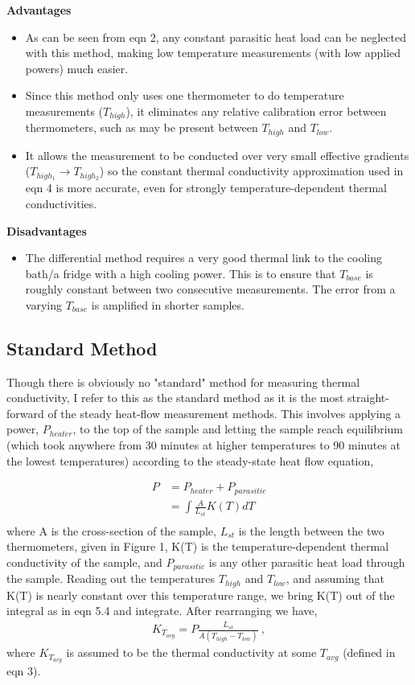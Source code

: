 \documentclass{report}
\begin{document}
\textbf{Advantages}
\begin{itemize}
\item As can be seen from eqn 2, any constant parasitic heat load can be neglected with this method, making low temperature measurements (with low applied powers) much easier.
\item Since this method only uses one thermometer to do temperature measurements ($T_{high}$), it eliminates any relative calibration error between thermometers, such as may be present between $T_{high}$ and $T_{low}$.
\item It allows the measurement to be conducted over very small effective gradients ($T_{high_1} \rightarrow T_{high_2}$) so the constant thermal conductivity approximation used in eqn 4 is more accurate, even for strongly temperature-dependent thermal conductivities.
\end{itemize}

\bigskip

\textbf{Disadvantages}
\begin{itemize}
\item The differential method requires a very good thermal link to the cooling bath/a fridge with a high cooling power. This is to ensure that $T_{base}$ is roughly constant between two consecutive measurements. The error from a varying $T_{base}$ is amplified in shorter samples.
\end{itemize}

\subsection{Standard Method}
Though there is obviously no "standard" method for measuring thermal conductivity, I refer to this as the standard method as it is the most straight-forward of the steady heat-flow measurement methods. This involves applying a power, $P_{heater}$, to the top of the sample and letting the sample reach equilibrium (which took anywhere from 30 minutes at higher temperatures to 90 minutes at the lowest temperatures) according to the steady-state heat flow equation,

\begin{equation}
    \begin{aligned}
P & = P_{heater} + P_{parasitic}\\
  & = \int \frac{A}{L_{st}} K(T)dT\\
    \end{aligned}
\end{equation}
where A is the cross-section of the sample, $L_{st}$ is the length between the two thermometers, given in Figure 1, K(T) is the temperature-dependent thermal conductivity of the sample, and $P_{parasitic}$ is any other parasitic heat load through the sample. Reading out the temperatures $T_{high}$ and $T_{low}$, and assuming that K(T) is nearly constant over this temperature range, we bring K(T) out of the integral as in eqn 5.4 and integrate. After rearranging we have,
\begin{eqnarray}
K_{T_{avg}} = P\frac{L_{st}}{A(T_{high} - T_{low})} \ ,
\end{eqnarray}
where $K_{T_{avg}}$ is assumed to be the thermal conductivity at some $T_{avg}$ (defined in eqn 3).
\end{document}
